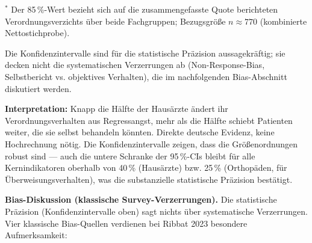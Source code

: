 \documentclass{umbruch-position}
\begin{document}
\smallskip
\noindent\small $^{\ast}$ Der 85\,\%-Wert bezieht sich auf die zusammengefasste Quote berichteten Verordnungs\-verzichts über beide Fachgruppen; Bezugsgröße $n \approx 770$ (kombinierte Nettostichprobe).

\medskip
\noindent Die Konfidenzintervalle sind für die statistische Präzision aussagekräftig; sie decken nicht die systematischen Verzerrungen ab (Non-Response-Bias, Selbstbericht vs. objektives Verhalten), die im nachfolgenden Bias-Abschnitt diskutiert werden.

\textbf{Interpretation:} Knapp die Hälfte der Hausärzte ändert ihr Verordnungsverhalten aus Regressangst, mehr als die Hälfte schiebt Patienten weiter, die sie selbst behandeln könnten. Direkte deutsche Evidenz, keine Hochrechnung nötig. Die Konfidenzintervalle zeigen, dass die Größenordnungen robust sind --- auch die untere Schranke der 95\,\%-CIs bleibt für alle Kernindikatoren oberhalb von 40\,\% (Hausärzte) bzw. 25\,\% (Orthopäden, für Überweisungsverhalten), was die substanzielle statistische Präzision bestätigt.

\medskip
\noindent\textbf{Bias-Diskussion (klassische Survey-Verzerrungen).} Die statistische Präzision (Konfidenz\-intervalle oben) sagt nichts über systematische Verzerrungen. Vier klassische Bias-Quellen verdienen bei Ribbat 2023 besondere Aufmerksamkeit:
\end{document}
